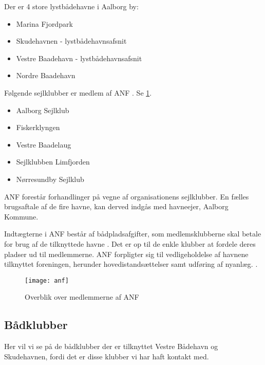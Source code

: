 Der er 4 store lystbådehavne i Aalborg by:
\begin{itemize}[noitemsep]
    \item Marina Fjordpark
    \item Skudehavnen - lystbådehavnsafsnit
    \item Vestre Baadehavn - lystbådehavnsafsnit
    \item Nordre Baadehavn
\end{itemize}



Følgende sejlklubber er medlem af ANF \cite{anf_havnereglement}. Se \cref{fig:anf_overblik}.
\begin{itemize}[noitemsep]
	\item Aalborg Sejlklub
	\item Fiskerklyngen
	\item Vestre Baadelaug
	\item Sejlklubben Limfjorden
	\item Nørresundby Sejlklub
\end{itemize}
 
ANF forestår forhandlinger på vegne af organisationens sejlklubber. En fælles brugsaftale af de fire havne, kan derved indgås med havneejer, Aalborg Kommune.

Indtægterne i ANF består af bådpladsafgifter, som medlemsklubberne skal betale for brug af de tilknyttede havne \cite{anf_budget_2013}. Det er op til de enkle klubber at fordele deres pladser ud til medlemmerne. ANF forpligter sig til vedligeholdelse af havnene tilknyttet foreningen, herunder hovedistandsættelser samt udføring af nyanlæg. \cite{anf_brugsaftale_2012}.

\begin{figure}
  \centering
  \texttt{[image: anf]}
 	\caption{Overblik over medlemmerne af ANF} 	\label{fig:anf_overblik}
\end{figure}



\subsection{Bådklubber}
Her vil vi se på de bådklubber der er tilknyttet Vestre Bådehavn og Skudehavnen, fordi det er disse klubber vi har haft kontakt med.

